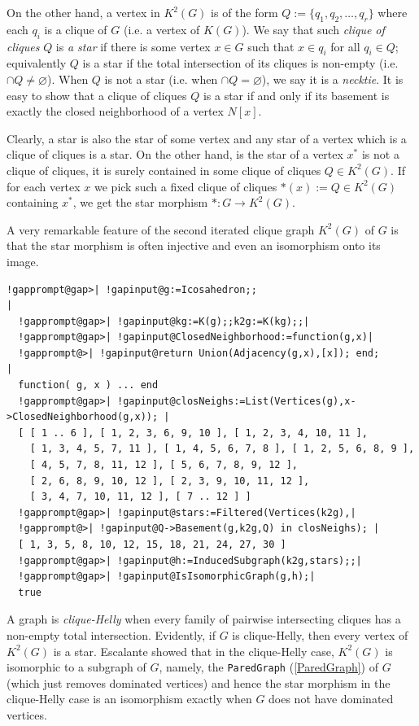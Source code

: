 \documentclass[a4paper,11pt]{report}
\begin{document}
{{On the other hand, a vertex in $K^2(G)$ is of the form $Q:=\{q_1,q_2,\ldots,q_r\}$ where each $q_i$ is a clique of $G$ (i.e. a vertex of $K(G)$). We say that such \emph{clique of cliques} $Q$ is \emph{a star} if there is some vertex $x\in G$ such that $x\in q_i$ for all $q_i\in Q$; equivalently $Q$ is a star if the total intersection of its cliques is non-empty (i.e. $\cap Q \neq \varnothing$). When $Q$ is not a star (i.e. when $\cap Q = \varnothing$), we say it is a \emph{necktie}. It is easy to show that a clique of cliques $Q$ is a star if and only if its basement is exactly the closed neighborhood of a
vertex $N[x]$. 

Clearly, a star is also the star of some vertex and any star of a vertex which
is a clique of cliques is a star. On the other hand, is the star of a vertex $x^*$ is not a clique of cliques, it is surely contained in some clique of cliques $Q\in K^2(G)$. If for each vertex $x$ we pick such a fixed clique of cliques $*(x):=Q\in K^2(G)$ containing $x^*$, we get the star morphism $*:G\rightarrow K^2(G)$. 

A very remarkable feature of the second iterated clique graph $K^2(G)$ of $G$ is that the star morphism is often injective and even an isomorphism onto its
image. 

 
\begin{Verbatim}[commandchars=!@|,fontsize=\small,frame=single,label=Example]
  !gapprompt@gap>| !gapinput@g:=Icosahedron;;                                 |
  !gapprompt@gap>| !gapinput@kg:=K(g);;k2g:=K(kg);;|
  !gapprompt@gap>| !gapinput@ClosedNeighborhood:=function(g,x)|
  !gapprompt@>| !gapinput@return Union(Adjacency(g,x),[x]); end;       |
  function( g, x ) ... end
  !gapprompt@gap>| !gapinput@closNeighs:=List(Vertices(g),x->ClosedNeighborhood(g,x)); |
  [ [ 1 .. 6 ], [ 1, 2, 3, 6, 9, 10 ], [ 1, 2, 3, 4, 10, 11 ], 
    [ 1, 3, 4, 5, 7, 11 ], [ 1, 4, 5, 6, 7, 8 ], [ 1, 2, 5, 6, 8, 9 ], 
    [ 4, 5, 7, 8, 11, 12 ], [ 5, 6, 7, 8, 9, 12 ], 
    [ 2, 6, 8, 9, 10, 12 ], [ 2, 3, 9, 10, 11, 12 ], 
    [ 3, 4, 7, 10, 11, 12 ], [ 7 .. 12 ] ]
  !gapprompt@gap>| !gapinput@stars:=Filtered(Vertices(k2g),|
  !gapprompt@>| !gapinput@Q->Basement(g,k2g,Q) in closNeighs); |
  [ 1, 3, 5, 8, 10, 12, 15, 18, 21, 24, 27, 30 ]
  !gapprompt@gap>| !gapinput@h:=InducedSubgraph(k2g,stars);;|
  !gapprompt@gap>| !gapinput@IsIsomorphicGraph(g,h);|
  true
\end{Verbatim}
 

A graph is \emph{clique-Helly} when every family of pairwise intersecting cliques has a non-empty total
intersection. Evidently, if $G$ is clique-Helly, then every vertex of $K^2(G)$ is a star. Escalante \cite{Esc73} showed that in the clique-Helly case, $K^2(G)$ is isomorphic to a subgraph of $G$, namely, the \texttt{ParedGraph} (\ref{ParedGraph}) of $G$ (which just removes dominated vertices) and hence the star morphism in the clique-Helly case is an isomorphism
exactly when $G$ does not have dominated vertices. 

}}
\end{document}
